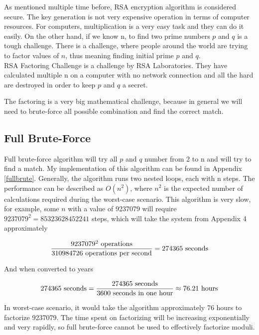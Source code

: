 \documentclass[a4paper, 12pt]{article}
\begin{document}
As mentioned multiple time before, RSA encryption algorithm is considered secure. The key
generation is not very expensive operation in terms of computer resources. For computers,
multiplication is a very easy task and they can do it easily. On the other hand, if we know n, to
find two prime numbers $p$ and $q$ is a tough challenge. There is a challenge, where people around
the world are trying to factor values of $n$, thus meaning finding initial prime $p$ and $q$.\cite{rsa}\\

RSA Factoring Challenge is a challenge by RSA Laboratories. They have calculated multiple n on
a computer with no network connection and all the hard are destroyed in order to keep $p$ and $q$ a
secret.

The factoring is a very big mathematical challenge, because in general we will need to brute-force
all possible combination and find the correct match.

\subsection{Full Brute-Force}
\label{bsec:full}

Full brute-force algorithm will try all $p$ and $q$ number from 2 to n and will try to find a match. My
implementation of this algorithm can be found in Appendix \ref{fullbrute}. Generally, the algorithm runs two
nested loops, each with n steps. The performance can be described as $O(n^2)$, where $n^2$ is the
expected number of calculations required during the worst-case scenario.
This algorithm is very slow, for example, some $n$ with a value of
9237079 will require $9237079^2 = 85323628452241$ steps, which will take the system from
Appendix 4 approximately

\begin{equation*}
  \frac{9237079^2 \text{ operations}}{ 310984726 \text{ operations per second}} = 274365 \text{ seconds}\\
  \end{equation*}

And when converted to years

\begin{equation*}
  274365 \text{ seconds}=\frac{274365 \text{ seconds}}{3600  \text{ seconds in one hour}} \approx 76.21 \text{ hours}\\
  \end{equation*}

In worst-case scenario, it would take the algorithm approximately 76 hours to factorize 9237079. The time spent on factorizing
will be increasing exponentially and very rapidly, so full brute-force cannot be used to effectively factorize
moduli.\\
\end{document}
